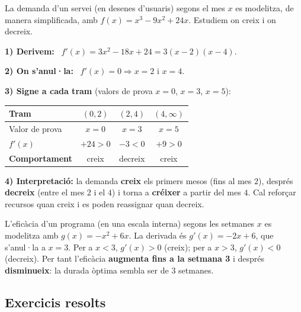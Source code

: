\begin{exemple}
La demanda d'un servei (en desenes d'usuaris) segons el mes $x$ es modelitza, de manera
simplificada, amb $f(x)=x^3-9x^2+24x$. Estudiem on creix i on decreix.

\medskip
\noindent\textbf{1) Derivem:} \ $f'(x)=3x^2-18x+24=3(x-2)(x-4)$.

\noindent\textbf{2) On s'anul·la:} \ $f'(x)=0 \Rightarrow x=2$ i $x=4$.

\noindent\textbf{3) Signe a cada tram} (valors de prova $x=0$, $x=3$, $x=5$):
\begin{center}
\renewcommand{\arraystretch}{1.3}
\begin{tabular}{l c c c}
\toprule
\textbf{Tram} & $(0,2)$ & $(2,4)$ & $(4,\infty)$ \\
\midrule
Valor de prova & $x=0$ & $x=3$ & $x=5$ \\
$f'(x)$ & $+24>0$ & $-3<0$ & $+9>0$ \\
\textbf{Comportament} & creix & decreix & creix \\
\bottomrule
\end{tabular}
\end{center}
\noindent\textbf{4) Interpretació:} la demanda \textbf{creix} els primers mesos (fins
al mes $2$), després \textbf{decreix} (entre el mes $2$ i el $4$) i torna a
\textbf{créixer} a partir del mes $4$. Cal reforçar recursos quan creix i es poden
reassignar quan decreix.
\end{exemple}

\begin{exemple}
L'eficàcia d'un programa (en una escala interna) segons les setmanes $x$ es modelitza
amb $g(x)=-x^2+6x$. La derivada és $g'(x)=-2x+6$, que s'anul·la a
$x=3$. Per a $x<3$, $g'(x)>0$ (creix); per a $x>3$, $g'(x)<0$ (decreix). Per tant
l'eficàcia \textbf{augmenta fins a la setmana 3} i després \textbf{disminueix}: la
durada òptima sembla ser de $3$ setmanes.
\end{exemple}

\subsection{Exercicis resolts}

